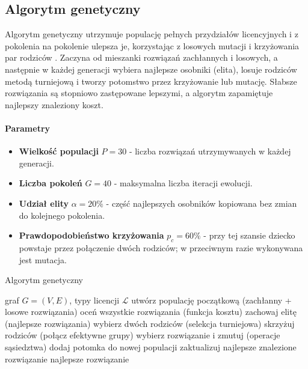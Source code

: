 \subsection{Algorytm genetyczny}\label{subsec:ga}
Algorytm genetyczny utrzymuje populację pełnych przydziałów licencyjnych i z pokolenia na pokolenie ulepsza je, korzystając z losowych mutacji i krzyżowania par rodziców \cite{holland1975,goldberg1989}. Zaczyna od mieszanki rozwiązań zachłannych i losowych, a następnie w każdej generacji wybiera najlepsze osobniki (elita), losuje rodziców metodą turniejową i tworzy potomstwo przez krzyżowanie lub mutację. Słabsze rozwiązania są stopniowo zastępowane lepszymi, a algorytm zapamiętuje najlepszy znaleziony koszt.

\paragraph{Parametry}
\begin{itemize}
  \item \textbf{Wielkość populacji} $P=30$ - liczba rozwiązań utrzymywanych w każdej generacji.
  \item \textbf{Liczba pokoleń} $G=40$ - maksymalna liczba iteracji ewolucji.
  \item \textbf{Udział elity} $\alpha=20\%$ - część najlepszych osobników kopiowana bez zmian do kolejnego pokolenia.
  \item \textbf{Prawdopodobieństwo krzyżowania} $p_c=60\%$ - przy tej szansie dziecko powstaje przez połączenie dwóch rodziców; w przeciwnym razie wykonywana jest mutacja.
\end{itemize}

\begin{algorithm}[H]
  \caption{Algorytm genetyczny}
  \label{alg:ga}
  \begin{algorithmic}[1]
    \Require graf $G=(V,E)$, typy licencji $\mathcal{L}$
    \State utwórz populację początkową (zachłanny + losowe rozwiązania)
    \State oceń wszystkie rozwiązania (funkcja kosztu)
    \State zachowaj elitę (najlepsze rozwiązania)
    \State wybierz dwóch rodziców (selekcja turniejowa)
    \State skrzyżuj rodziców (połącz efektywne grupy)
    \Else
    \State wybierz rozwiązanie i zmutuj (operacje sąsiedztwa)
    \EndIf
    \State dodaj potomka do nowej populacji
    \EndWhile
    \State zaktualizuj najlepsze znalezione rozwiązanie
    \EndFor
    \State \Return najlepsze rozwiązanie
  \end{algorithmic}
\end{algorithm}

